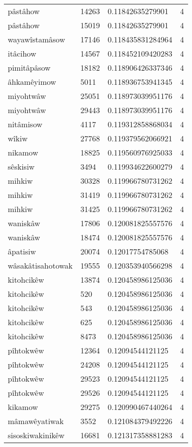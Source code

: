 \begin{longtable}{llll}
pâstâhow & 14263 & 0.11842635279901 & 4 \\
pâstâhow & 15019 & 0.11842635279901 & 4 \\
wayawîstamâsow & 17146 & 0.118435831284964 & 4 \\
itâcihow & 14567 & 0.118452109420283 & 4 \\
pimitâpâsow & 18182 & 0.118906426337346 & 4 \\
âhkamêyimow & 5011 & 0.118936753941345 & 4 \\
miyohtwâw & 25051 & 0.118973039951176 & 4 \\
miyohtwâw & 29443 & 0.118973039951176 & 4 \\
nitâmisow & 4117 & 0.119312858868034 & 4 \\
wîkiw & 27768 & 0.119379562066921 & 4 \\
nikamow & 18825 & 0.119560976925033 & 4 \\
sêskisiw & 3494 & 0.119934622600279 & 4 \\
mihkiw & 30328 & 0.119966780731262 & 4 \\
mihkiw & 31419 & 0.119966780731262 & 4 \\
mihkiw & 31425 & 0.119966780731262 & 4 \\
waniskâw & 17806 & 0.120081825557576 & 4 \\
waniskâw & 18474 & 0.120081825557576 & 4 \\
âpatisiw & 20074 & 0.12017754785068 & 4 \\
wâsakâtisahotowak & 19555 & 0.120353940566298 & 4 \\
kitohcikêw & 13874 & 0.120458986125036 & 4 \\
kitohcikêw & 520 & 0.120458986125036 & 4 \\
kitohcikêw & 543 & 0.120458986125036 & 4 \\
kitohcikêw & 625 & 0.120458986125036 & 4 \\
kitohcikêw & 8473 & 0.120458986125036 & 4 \\
pîhtokwêw & 12364 & 0.12094544121125 & 4 \\
pîhtokwêw & 24208 & 0.12094544121125 & 4 \\
pîhtokwêw & 29523 & 0.12094544121125 & 4 \\
pîhtokwêw & 29526 & 0.12094544121125 & 4 \\
kikamow & 29275 & 0.120990467440264 & 4 \\
mâmawêyatiwak & 3552 & 0.121084379492226 & 4 \\
sisoskiwakinikêw & 16681 & 0.121317358881283 & 4 \\

\end{longtable}
